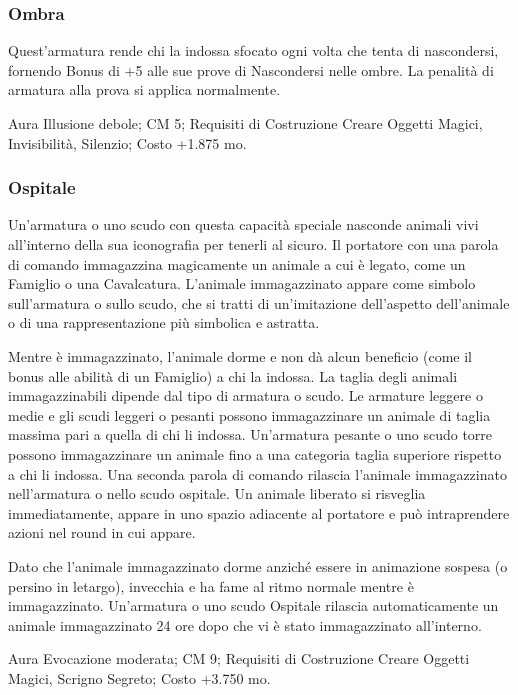 \begin{multicols}{2}
\subsubsection{Ombra}

Quest'armatura rende chi la indossa sfocato ogni volta che tenta di nascondersi, fornendo Bonus di +5 alle sue prove di Nascondersi nelle ombre. La penalità di armatura alla prova si applica normalmente.

Aura Illusione debole; CM 5; Requisiti di Costruzione Creare Oggetti Magici, Invisibilità, Silenzio; Costo +1.875 mo.

\subsubsection{Ospitale}

Un'armatura o uno scudo con questa capacità speciale nasconde animali vivi all'interno della sua iconografia per tenerli al sicuro. Il portatore con una parola di comando immagazzina magicamente un animale a cui è legato, come un Famiglio o una Cavalcatura. L'animale immagazzinato appare come simbolo sull'armatura o sullo scudo, che si tratti di un'imitazione dell'aspetto dell'animale o di una rappresentazione più simbolica e astratta.

Mentre è immagazzinato, l'animale dorme e non dà alcun beneficio (come il bonus alle abilità di un Famiglio) a chi la indossa. La taglia degli animali immagazzinabili dipende dal tipo di armatura o scudo. Le armature leggere o medie e gli scudi leggeri o pesanti possono immagazzinare un animale di taglia massima pari a quella di chi li indossa. Un'armatura pesante o uno scudo torre possono immagazzinare un animale fino a una categoria taglia superiore rispetto a chi li indossa. Una seconda parola di comando rilascia l'animale immagazzinato nell'armatura o nello scudo ospitale. Un animale liberato si risveglia immediatamente, appare in uno spazio adiacente al portatore e può intraprendere azioni nel round in cui appare.

Dato che l'animale immagazzinato dorme anziché essere in animazione sospesa (o persino in letargo), invecchia e ha fame al ritmo normale mentre è immagazzinato. Un'armatura o uno scudo Ospitale rilascia automaticamente un animale immagazzinato 24 ore dopo che vi è stato immagazzinato all'interno.

Aura Evocazione moderata; CM 9; Requisiti di Costruzione Creare Oggetti Magici, Scrigno Segreto; Costo +3.750 mo.



\end{multicols}

